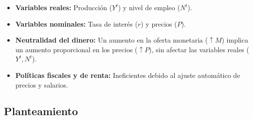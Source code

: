 \documentclass[
  doc,
  floatsintext,
  longtable,
  a4paper,
  nolmodern,
  notxfonts,
  notimes,
  12pt,
  colorlinks=true,linkcolor=blue,citecolor=blue,urlcolor=blue]{apa7}
\providecommand{\tightlist}{%
  \setlength{\itemsep}{0pt}\setlength{\parskip}{0pt}}
\begin{document}
\begin{itemize}
\tightlist
\item
  \textbf{Variables reales:} Producción (\(Y^t\)) y nivel de empleo
  (\(N^t\)).
\item
  \textbf{Variables nominales:} Tasa de interés (\(r\)) y precios
  (\(P\)).
\item
  \textbf{Neutralidad del dinero:} Un aumento en la oferta monetaria
  (\(\uparrow M\)) implica un aumento proporcional en los precios
  (\(\uparrow P\)), sin afectar las variables reales (\(Y^t, N^t\)).
\item
  \textbf{Políticas fiscales y de renta:} Ineficientes debido al ajuste
  automático de precios y salarios.
\end{itemize}

\subsection{Planteamiento}\label{planteamiento}
\end{document}
